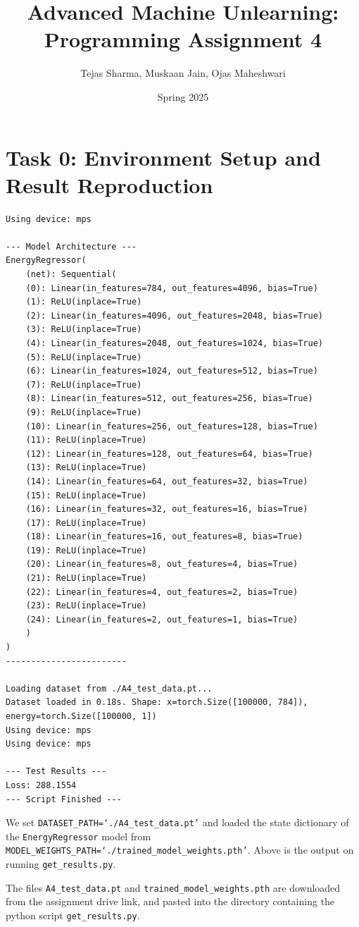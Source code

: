 \documentclass{article}
\title{Advanced Machine Unlearning: Programming Assignment 4}
\author{Tejas Sharma, Muskaan Jain, Ojas Maheshwari}
\date{Spring 2025}
\begin{document}
\maketitle
\section{Task 0: Environment Setup and Result Reproduction}
\begin{lstlisting}
Using device: mps

--- Model Architecture ---
EnergyRegressor(
    (net): Sequential(
    (0): Linear(in_features=784, out_features=4096, bias=True)
    (1): ReLU(inplace=True)
    (2): Linear(in_features=4096, out_features=2048, bias=True)
    (3): ReLU(inplace=True)
    (4): Linear(in_features=2048, out_features=1024, bias=True)
    (5): ReLU(inplace=True)
    (6): Linear(in_features=1024, out_features=512, bias=True)
    (7): ReLU(inplace=True)
    (8): Linear(in_features=512, out_features=256, bias=True)
    (9): ReLU(inplace=True)
    (10): Linear(in_features=256, out_features=128, bias=True)
    (11): ReLU(inplace=True)
    (12): Linear(in_features=128, out_features=64, bias=True)
    (13): ReLU(inplace=True)
    (14): Linear(in_features=64, out_features=32, bias=True)
    (15): ReLU(inplace=True)
    (16): Linear(in_features=32, out_features=16, bias=True)
    (17): ReLU(inplace=True)
    (18): Linear(in_features=16, out_features=8, bias=True)
    (19): ReLU(inplace=True)
    (20): Linear(in_features=8, out_features=4, bias=True)
    (21): ReLU(inplace=True)
    (22): Linear(in_features=4, out_features=2, bias=True)
    (23): ReLU(inplace=True)
    (24): Linear(in_features=2, out_features=1, bias=True)
    )
)
------------------------

Loading dataset from ./A4_test_data.pt...
Dataset loaded in 0.18s. Shape: x=torch.Size([100000, 784]), energy=torch.Size([100000, 1])
Using device: mps
Using device: mps

--- Test Results ---
Loss: 288.1554
--- Script Finished ---
\end{lstlisting}
We set \texttt{DATASET\_PATH=`./A4\_test\_data.pt'} and loaded the state dictionary of the \texttt{EnergyRegressor} model from \texttt{MODEL\_WEIGHTS\_PATH=`./trained\_model\_weights.pth'}. Above is the output on running \texttt{get\_results.py}.

The files \texttt{A4\_test\_data.pt} and \texttt{trained\_model\_weights.pth} are downloaded from the assignment drive link, and pasted into the directory containing the python script \texttt{get\_results.py}.
\end{document}
